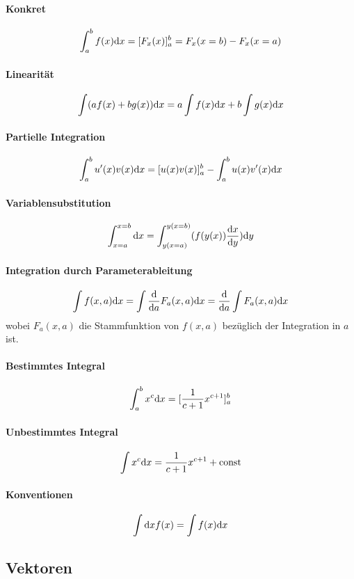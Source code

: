 \paragraph{Konkret}
$$ \int_a^b f(x) \mathrm d x = [ F_x(x) ]_a^b = F_x(x = b) - F_x(x = a)$$

\paragraph{Linearität}
$$ \int (a f(x) + b g(x)) \mathrm d x = a \int f(x) \mathrm d x + b \int g(x) \mathrm d x$$

\paragraph{Partielle Integration}
$$\int_a^b u'(x)v(x) \mathrm d x = [u(x) v(x)]_a^b - \int_a^b u(x) v'(x) \mathrm d x$$

\paragraph{Variablensubstitution}
$$\int_{x = a}^{x = b} \mathrm d x = \int_{y(x = a)}^{y(x = b)} ( f(y(x))\frac{\mathrm d x}{\mathrm d y} ) \mathrm d y$$

\paragraph{Integration durch Parameterableitung}
$$\int f(x, a) \mathrm d x = \int \frac{\mathrm d}{\mathrm d a} F_a(x,a) \mathrm d x = \frac{\mathrm d}{\mathrm d a} \int F_a(x,a) \mathrm d x$$
wobei $F_a(x,a)$ die Stammfunktion von $f(x,a)$ bezüglich der Integration in $a$ ist.

\paragraph{Bestimmtes Integral}
$$\int_a^b x^c \mathrm d x = [ \frac1{c + 1} x^{c+1}]_a^b$$

\paragraph{Unbestimmtes Integral}
$$\int x^c \mathrm d x = \frac1{c+1} x^{c+1} + \mathrm{const}$$

\paragraph{Konventionen}
$$\int \mathrm d x f(x) = \int f(x) \mathrm d x$$

\subsection{Vektoren}
